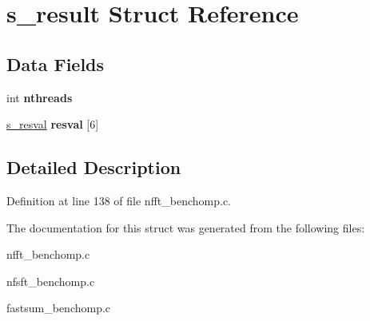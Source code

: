 \hypertarget{structs__result}{\section{s\-\_\-result Struct Reference}
\label{structs__result}
}
\subsection*{Data Fields}
\begin{DoxyCompactItemize}
\item 
\hypertarget{structs__result_aca01173e4ebcbb7307ae51a36a7d0a1c}{int {\bfseries nthreads}}\label{structs__result_aca01173e4ebcbb7307ae51a36a7d0a1c}

\item 
\hypertarget{structs__result_a04dc463c2923a9e02349fd00d6ec39f0}{\hyperlink{structs__resval}{s\-\_\-resval} {\bfseries resval} \mbox{[}6\mbox{]}}\label{structs__result_a04dc463c2923a9e02349fd00d6ec39f0}

\end{DoxyCompactItemize}


\subsection{Detailed Description}


Definition at line 138 of file nfft\-\_\-benchomp.\-c.



The documentation for this struct was generated from the following files\-:\begin{DoxyCompactItemize}
\item 
nfft\-\_\-benchomp.\-c\item 
nfsft\-\_\-benchomp.\-c\item 
fastsum\-\_\-benchomp.\-c\end{DoxyCompactItemize}
